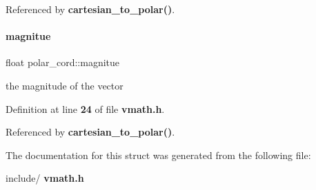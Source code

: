 Referenced by \textbf{ cartesian\+\_\+to\+\_\+polar()}.

\mbox{\label{structpolar__cord_aec2e25fecc82af176f0fcd23f1e02f0c}} 
\paragraph{magnitue}
{\footnotesize\ttfamily float polar\+\_\+cord\+::magnitue}

the magnitude of the vector 

Definition at line \textbf{ 24} of file \textbf{ vmath.\+h}.



Referenced by \textbf{ cartesian\+\_\+to\+\_\+polar()}.



The documentation for this struct was generated from the following file\+:\begin{DoxyCompactItemize}
\item 
include/\textbf{ vmath.\+h}\end{DoxyCompactItemize}
